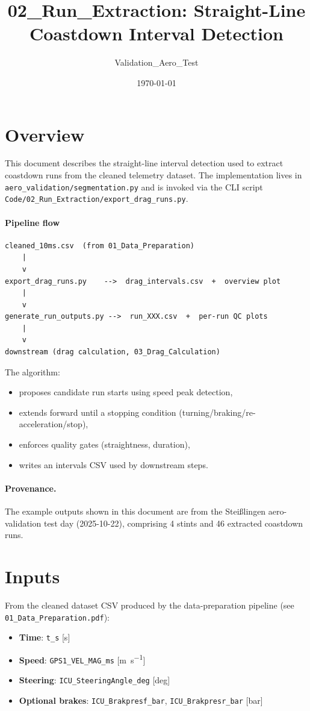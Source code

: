 \documentclass[11pt,a4paper]{article}
\title{02\_Run\_Extraction: Straight-Line Coastdown Interval Detection}
\author{Validation\_Aero\_Test}
\date{\today}
\begin{document}
\maketitle

\section{Overview}
This document describes the straight-line interval detection used to extract
coastdown runs from the cleaned telemetry dataset.  The implementation lives in
\texttt{aero\_validation/segmentation.py} and is invoked via the CLI script
\texttt{Code/02\_Run\_Extraction/export\_drag\_runs.py}.

\paragraph{Pipeline flow}
\begin{center}
\begin{verbatim}
cleaned_10ms.csv  (from 01_Data_Preparation)
    |
    v
export_drag_runs.py    -->  drag_intervals.csv  +  overview plot
    |
    v
generate_run_outputs.py -->  run_XXX.csv  +  per-run QC plots
    |
    v
downstream (drag calculation, 03_Drag_Calculation)
\end{verbatim}
\end{center}

The algorithm:
\begin{itemize}
  \item proposes candidate run starts using speed peak detection,
  \item extends forward until a stopping condition (turning/braking/re-acceleration/stop),
  \item enforces quality gates (straightness, duration),
  \item writes an intervals CSV used by downstream steps.
\end{itemize}

\paragraph{Provenance.}
The example outputs shown in this document are from the Stei\ss{}lingen
aero-validation test day (2025-10-22), comprising 4 stints and 46 extracted
coastdown runs.

\section{Inputs}
From the cleaned dataset CSV produced by the data-preparation pipeline
(see \texttt{01\_Data\_Preparation.pdf}):
\begin{itemize}
  \item \textbf{Time}: \texttt{t\_s} [s]
  \item \textbf{Speed}: \texttt{GPS1\_VEL\_MAG\_ms} [\si{\meter\per\second}]
  \item \textbf{Steering}: \texttt{ICU\_SteeringAngle\_deg} [deg]
  \item \textbf{Optional brakes}: \texttt{ICU\_Brakpresf\_bar}, \texttt{ICU\_Brakpresr\_bar} [bar]
\end{itemize}
\end{document}
